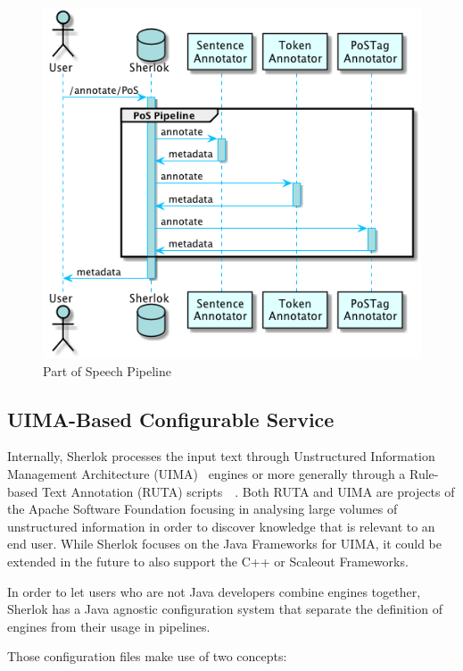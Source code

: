 \documentclass{article}
\begin{document}
\begin{figure}
    \centering
    \includegraphics[width=0.7\linewidth]{res/sherlok_basic_rest_call.png}
    \caption{Part of Speech Pipeline}
    \label{fig:sherlok_basic_rest_call}
\end{figure}

\subsection{UIMA-Based Configurable Service}

Internally, Sherlok processes the input text through Unstructured Information Management
Architecture (UIMA)~\cite{uima} engines or more generally through a Rule-based Text Annotation
(RUTA) scripts~\cite{ruta}~\cite{ruta_2014}. Both RUTA and UIMA are projects of the Apache Software
Foundation \cite{apachefundation} focusing in analysing large volumes of unstructured information in
order to discover knowledge that is relevant to an end user. While Sherlok focuses on the Java
Frameworks for UIMA, it could be extended in the future to also support the C++ or Scaleout
Frameworks.

In order to let users who are not Java developers combine engines together, Sherlok has a Java
agnostic configuration system that separate the definition of engines from their usage in pipelines.

Those configuration files make use of two concepts:
\end{document}
